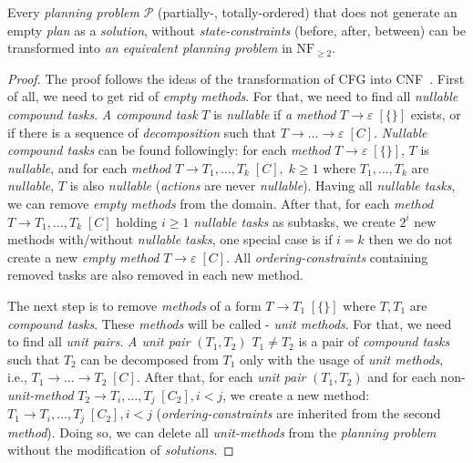 \begin{thm}\label{thm04:5}
    Every \emph{planning problem} $\mathcal{P}$ (partially-, totally-ordered) that does not generate an empty \emph{plan} as a \emph{solution}, without \emph{state-constraints} (before, after, between) can be transformed into \emph{an equivalent planning problem} in $\text{NF}_{\geq 2}$.
\end{thm}
\begin{proof}
    The proof follows the ideas of the transformation of CFG into CNF~\cite{langclassification}. First of all, we need to get rid of \emph{empty methods}. For that, we need to find all \emph{nullable compound tasks}. \emph{A compound task} $T$ is \emph{nullable} if \emph{a method} $T \rightarrow \varepsilon \; [\{\}]$ exists, or if there is a sequence of \emph{decomposition} such that $T \rightarrow \dots \rightarrow \varepsilon \; [C]$. \emph{Nullable compound tasks} can be found followingly: for each \emph{method} $T \rightarrow \varepsilon \; [\{\}]$, $T$ is \emph{nullable}, and for each \emph{method} $T \rightarrow T_1, \dots, T_k \; [C], \; k \geq 1$ where $T_1, \dots, T_k$ are \emph{nullable}, $T$ is also \emph{nullable} (\emph{actions} are never \emph{nullable}). Having all \emph{nullable tasks}, we can remove \emph{empty methods} from the domain. After that, for each \emph{method} $T \rightarrow T_1, \dots, T_k \; [C]$ holding $i \geq 1$ \emph{nullable tasks} as subtasks, we create $2^i$ new methods with/without \emph{nullable tasks}, one special case is if $i = k$ then we do not create a new \emph{empty method} $T \rightarrow \varepsilon \; [C]$. All \emph{ordering-constraints} containing removed tasks are also removed in each new method. 
    
    The next step is to remove \emph{methods} of a form $T \rightarrow T_1 \; [\{\}]$ where $T, T_1$ are \emph{compound tasks}. These \emph{methods} will be called - \emph{unit methods}. For that, we need to find all \emph{unit pairs}. \emph{A unit pair} $(T_1, T_2)$ $T_1 \neq T_2$ is a pair of \emph{compound tasks} such that $T_2$ can be decomposed from $T_1$ only with the usage of \emph{unit methods}, i.e., $T_1 \rightarrow \dots \rightarrow T_2 \; [C]$. After that, for each \emph{unit pair} $(T_1, T_2)$ and for each non-\emph{unit-method} $T_2 \rightarrow T_i, \dots, T_j \; [C_2], i < j$, we create a new method: $T_1 \rightarrow T_i, \dots, T_j \; [C_2], i < j$ (\emph{ordering-constraints} are inherited from the second \emph{method}). Doing so, we can delete all \emph{unit-methods} from the \emph{planning problem} without the modification of \emph{solutions}.


\end{proof}
